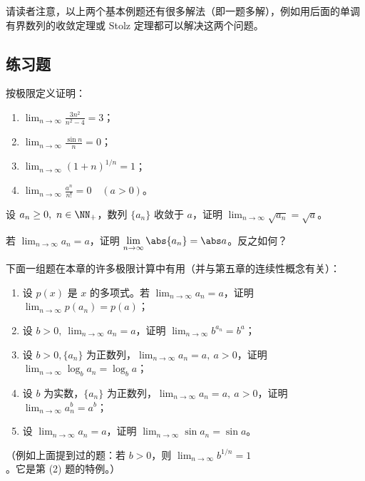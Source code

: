 \begin{xremark}
请读者注意，以上两个基本例题还有很多解法（即一题多解），例如用后面的单调有界数列的收敛定理或 Stolz 定理都可以解决这两个问题。
\end{xremark}

\subsection{练习题}

\begin{xexercise}[1]
按极限定义证明：
  \begin{enumerate}[label=(\arabic*)]
    \item $\displaystyle\lim_{n\to\infty}\frac{3n^2}{n^2-4}=3$；
    \item $\displaystyle\lim_{n\to\infty}\frac{\sin n}{n}=0$；
    \item $\displaystyle\lim_{n\to\infty}(1+n)^{1/n}=1$；
    \item $\displaystyle\lim_{n\to\infty}\frac{a^n}{n!}=0\quad(a>0)$。
  \end{enumerate}
\end{xexercise}

\begin{xexercise}[2]
设 $a_n\ge0,\ n\in\NN_+$，数列 $\{a_n\}$ 收敛于 $a$，证明 $\displaystyle\lim_{n\to\infty}\sqrt{a_n}=\sqrt a$。
\end{xexercise}

\begin{xexercise}[3]
若 $\displaystyle\lim_{n\to\infty}a_n=a$，证明 $\displaystyle\lim_{n\to\infty}\abs{a_n}=\abs a$。反之如何？
\end{xexercise}

\begin{xexercise}[4]
下面一组题在本章的许多极限计算中有用（并与第五章的连续性概念有关）：
  \begin{enumerate}[label=(\arabic*)]
    \item 设 $p(x)$ 是 $x$ 的多项式。若 $\displaystyle\lim_{n\to\infty}a_n=a$，证明 $\displaystyle\lim_{n\to\infty}p(a_n)=p(a)$；
    \item 设 $b>0,\ \displaystyle\lim_{n\to\infty}a_n=a$，证明 $\displaystyle\lim_{n\to\infty}b^{a_n}=b^a$；
    \item 设 $b>0,\{a_n\}$ 为正数列，$\displaystyle\lim_{n\to\infty}a_n=a,\ a>0$，证明 $\displaystyle\lim_{n\to\infty}\log_b a_n=\log_b a$；
    \item 设 $b$ 为实数，$\{a_n\}$ 为正数列，$\displaystyle\lim_{n\to\infty}a_n=a,\ a>0$，证明 $\displaystyle\lim_{n\to\infty}a_n^b=a^b$；
    \item 设 $\displaystyle\lim_{n\to\infty}a_n=a$，证明 $\displaystyle\lim_{n\to\infty}\sin a_n=\sin a$。
  \end{enumerate}
  （例如上面提到过的题：若 $b>0$，则 $\displaystyle\lim_{n\to\infty}b^{1/n}=1$。它是第 (2) 题的特例。）
\end{xexercise}

